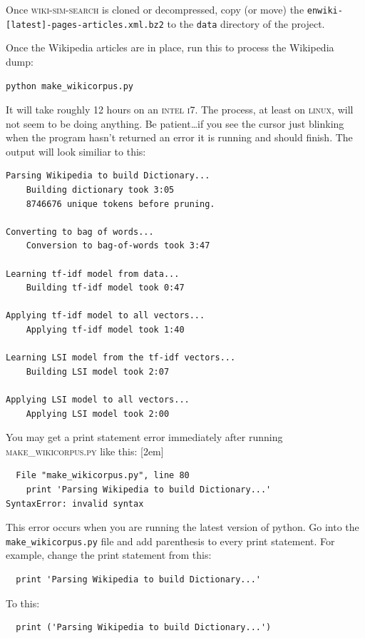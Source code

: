 Once \textsc{wiki-sim-search} is cloned or decompressed, copy (or move) the
\texttt{\small{enwiki-[latest]-pages-articles.xml.bz2}} to the \texttt{data} directory
of the project.

Once the Wikipedia articles are in place, run this to process the Wikipedia dump:
\begin{lstlisting}
python make_wikicorpus.py
\end{lstlisting}
It will take roughly 12 hours on an
\textsc{intel i7}. The process, at least on \textsc{linux}, will not seem to be doing
anything. Be patient\ldots if you see the cursor just blinking when the program
hasn't returned an error it is running and should finish. The output will look
similiar to this:
\begin{lstlisting}
Parsing Wikipedia to build Dictionary...
    Building dictionary took 3:05
    8746676 unique tokens before pruning.

Converting to bag of words...
    Conversion to bag-of-words took 3:47

Learning tf-idf model from data...
    Building tf-idf model took 0:47
     
Applying tf-idf model to all vectors...
    Applying tf-idf model took 1:40

Learning LSI model from the tf-idf vectors...
    Building LSI model took 2:07

Applying LSI model to all vectors...
    Applying LSI model took 2:00
\end{lstlisting}
You may get a print statement error immediately after running
\textsc{make\_wikicorpus.py} like this:
[2em]
\begin{lstlisting}
  File "make_wikicorpus.py", line 80
    print 'Parsing Wikipedia to build Dictionary...'
SyntaxError: invalid syntax
\end{lstlisting}
This error occurs when you are running the latest version of python. Go into the
\texttt{make\_wikicorpus.py} file and add parenthesis to every print statement.
For example, change the print statement from this:
\begin{lstlisting} 
  print 'Parsing Wikipedia to build Dictionary...'
\end{lstlisting}
To this:
\begin{lstlisting}
  print ('Parsing Wikipedia to build Dictionary...')
\end{lstlisting}
